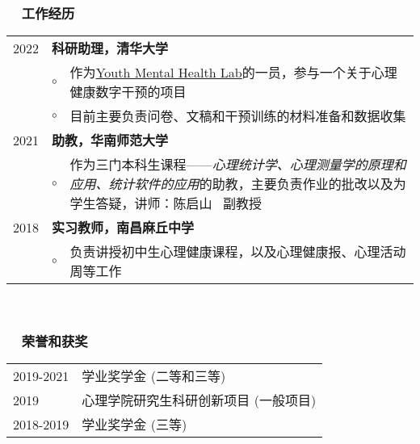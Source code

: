 \documentclass[a4paper, 12pt]{ctexart}
\begin{document}
\subsubsection*{ \ \ 工作经历}

\begin{tabularx}{\textwidth}{p{2cm} p{0.1cm} X}

    2022 & \multicolumn{2}{X}{\textbf{科研助理，清华大学}} \\
    & $ \circ $ & 作为\href{https://www.ymhlab.com}{Youth Mental Health Lab}的一员，参与一个关于心理健康数字干预的项目 \\
    & $ \circ $ & 目前主要负责问卷、文稿和干预训练的材料准备和数据收集 \\
    

    2021 & \multicolumn{2}{X}{\textbf{助教，华南师范大学}} \\
    & $ \circ $ & 作为三门本科生课程——\textit{心理统计学、心理测量学的原理和应用、统计软件的应用}的助教，主要负责作业的批改以及为学生答疑，讲师：陈启山 \ 副教授 \\

    2018 & \multicolumn{2}{X}{\textbf{实习教师，南昌麻丘中学}} \\
    & $ \circ $ & 负责讲授初中生心理健康课程，以及心理健康报、心理活动周等工作

    \end{tabularx}

\  \par 


\subsubsection*{ \ \ 荣誉和获奖}

\begin{tabularx}{\textwidth}{p{2cm} X}

    2019-2021 & 学业奖学金 (二等和三等)\\

    2019 & 心理学院研究生科研创新项目 (一般项目) \\
    
    2018-2019 & 学业奖学金 (三等)
    
\end{tabularx}
\end{document}
